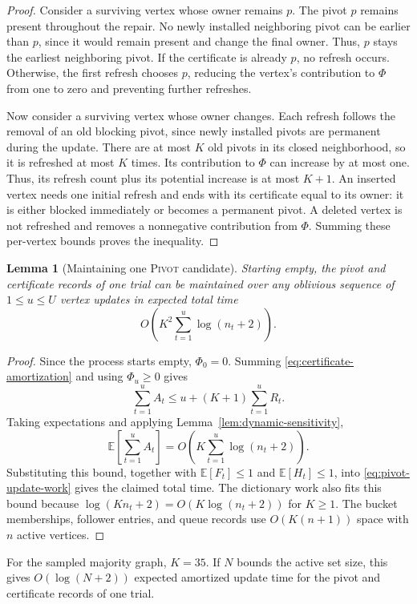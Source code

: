 \documentclass[11pt]{article}
\newtheorem{lemma}[theorem]{Lemma}
\theoremstyle{definition}
\theoremstyle{remark}
\newcommand{\1}{\mathbf{1}}
\begin{document}
\begin{proof}
Consider a surviving vertex whose owner remains $p$. The pivot $p$ remains present throughout the repair. No newly installed neighboring pivot can be earlier than $p$, since it would remain present and change the final owner. Thus, $p$ stays the earliest neighboring pivot. If the certificate is already $p$, no refresh occurs. Otherwise, the first refresh chooses $p$, reducing the vertex's contribution to $\Phi$ from one to zero and preventing further refreshes.

Now consider a surviving vertex whose owner changes. Each refresh follows the removal of an old blocking pivot, since newly installed pivots are permanent during the update. There are at most $K$ old pivots in its closed neighborhood, so it is refreshed at most $K$ times. Its contribution to $\Phi$ can increase by at most one. Thus, its refresh count plus its potential increase is at most $K+1$.
An inserted vertex needs one initial refresh and ends with its certificate equal to its owner: it is either blocked immediately or becomes a permanent pivot. A deleted vertex is not refreshed and removes a nonnegative contribution from $\Phi$. Summing these per-vertex bounds proves the inequality.
\end{proof}

\begin{lemma}[Maintaining one \textsc{Pivot} candidate]
\label{thm:single-pivot-maintenance}
Starting empty, the pivot and certificate records of one trial can be maintained over any oblivious sequence of $1\leq u\leq U$ vertex updates in expected total time
\[
    O\!\left(K^2\sum_{t=1}^{u}\log(n_t+2)\right).
\]
\end{lemma}

\begin{proof}
Since the process starts empty, $\Phi_0=0$. Summing \eqref{eq:certificate-amortization} and using $\Phi_u\geq0$ gives
\[
    \sum_{t=1}^{u}A_t
    \leq u+(K+1)\sum_{t=1}^{u}R_t.
\]
Taking expectations and applying Lemma~\ref{lem:dynamic-sensitivity},
\[
    \mathbb E\!\left[\sum_{t=1}^{u}A_t\right]
    =O\!\left(K\sum_{t=1}^{u}\log(n_t+2)\right).
\]
Substituting this bound, together with $\mathbb E[F_t]\leq1$ and $\mathbb E[H_t]\leq1$, into \eqref{eq:pivot-update-work} gives the claimed total time. The dictionary work also fits this bound because
$\log(Kn_t+2)=O(K\log(n_t+2))$ for $K\geq1$.
The bucket memberships, follower entries, and queue records use
$O(K(n+1))$ space with $n$ active vertices.
\end{proof}
For the sampled majority graph, $K=35$. If $N$ bounds the active set size, this gives $O(\log(N+2))$ expected amortized update time for the pivot and certificate records of one trial.
\end{document}
